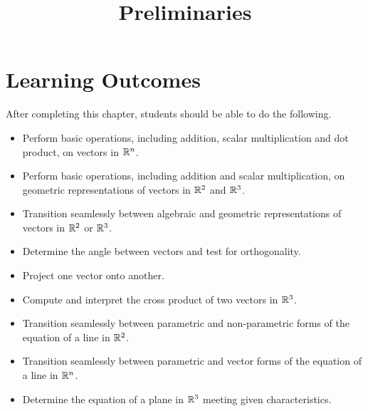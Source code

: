 \documentclass{ximera}
\title{Preliminaries}
\begin{document}
\begin{abstract}
\end{abstract}
 
\maketitle
 
\section*{Learning Outcomes}
After completing this chapter, students should be able to do the following.
 
\begin{itemize}
    \item Perform basic operations, including addition, scalar multiplication and dot product, on vectors in $\mathbb{R}^n$.
    
    \item Perform basic operations, including addition and scalar multiplication, on geometric representations of vectors in $\mathbb{R}^2$ and $\mathbb{R}^3$.
    
    \item Transition seamlessly between algebraic and geometric representations of vectors in $\mathbb{R}^2$ or $\mathbb{R}^3$.
    
   \item  Determine the angle between vectors and test for orthogonality.

   \item  Project one vector onto another.

   \item  Compute and interpret the cross product of two vectors in $\mathbb{R}^3$. 

   \item Transition seamlessly between parametric and non-parametric forms of the equation of a line in $\mathbb{R}^2$.
   
   \item Transition seamlessly between parametric and vector forms of the equation of a line in $\mathbb{R}^n$.

   \item  Determine the equation of a plane in $\mathbb{R}^3$ meeting given characteristics.
   
 \end{itemize}
 
\end{document}
